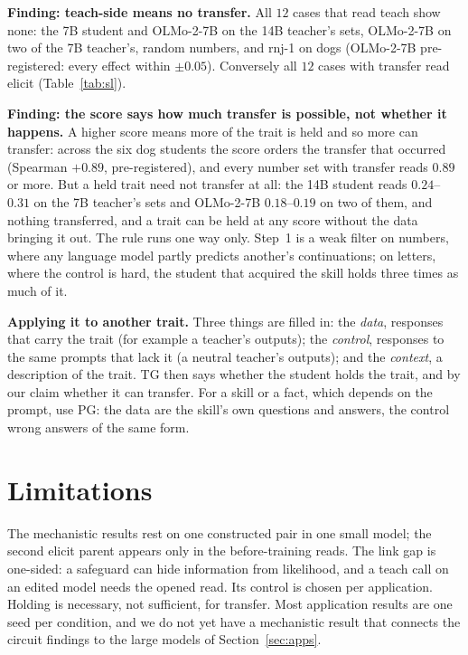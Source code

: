 \documentclass{article}
\theoremstyle{definition}
\begin{document}
\textbf{Finding: teach-side means no transfer.} All $12$ cases that read teach show none: the 7B student and
OLMo-2-7B on the 14B teacher's sets, OLMo-2-7B on two of the 7B teacher's, random numbers, and rnj-1 on dogs
(OLMo-2-7B pre-registered: every effect within $\pm0.05$). Conversely all $12$ cases with transfer read elicit
(Table~\ref{tab:sl}).

\textbf{Finding: the score says how much transfer is possible, not whether it happens.} A higher score means
more of the trait is held and so more can transfer: across the six dog students the score orders the transfer
that occurred (Spearman $+0.89$, pre-registered), and every number set with transfer reads $0.89$ or more. But a
held trait need not transfer at all: the 14B student reads $0.24$--$0.31$ on the 7B teacher's sets and OLMo-2-7B $0.18$--$0.19$ on two
of them, and nothing transferred, and a trait can be held at any score without the data bringing it out. The rule runs one way only. Step~1 is a weak filter on numbers, where any
language model partly predicts another's continuations; on letters, where the control is hard, the student that
acquired the skill holds three times as much of it.

\textbf{Applying it to another trait.} Three things are filled in: the \emph{data}, responses that carry the trait
(for example a teacher's outputs); the \emph{control}, responses to the same prompts that lack it (a neutral
teacher's outputs); and the \emph{context}, a description of the trait. TG then says whether the student holds
the trait, and by our claim whether it can transfer. For a skill or a fact, which depends on the prompt, use PG:
the data are the skill's own questions and answers, the control wrong answers of the same form.

\section{Limitations}

The mechanistic results rest on one constructed pair in one small model; the second elicit parent appears only in
the before-training reads. The link gap is one-sided: a safeguard can hide information from likelihood, and a
teach call on an edited model needs the opened read. Its control is chosen per application. Holding is necessary,
not sufficient, for transfer. Most application results are one seed per condition, and we do not yet have a
mechanistic result that connects the circuit findings to the large models of Section~\ref{sec:apps}.
\end{document}
